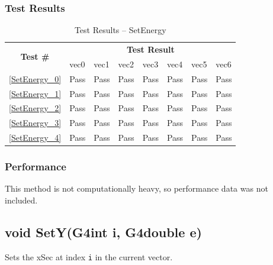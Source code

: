 \documentclass[12pt]{article}
\begin{document}
	\subsubsection{Test Results}
		\begin{table}[H]
		\centering
		\caption{Test Results -- SetEnergy}\label{SetEnergy_acc}
		\begin{tabular}{clllllll}
		\toprule
		\multirow{2}{*}{\bf Test \#} & \multicolumn{7}{c}{\bf Test Result}\\
		& vec0 & vec1 & vec2 & vec3 & vec4 & vec5 & vec6\\\midrule
		\ref{SetEnergy_0} & Pass & Pass & Pass & Pass & Pass & Pass & Pass\\
		\ref{SetEnergy_1} & Pass & Pass & Pass & Pass & Pass & Pass & Pass\\
		\ref{SetEnergy_2} & Pass & Pass & Pass & Pass & Pass & Pass & Pass\\
		\ref{SetEnergy_3} & Pass & Pass & Pass & Pass & Pass & Pass & Pass\\
		\ref{SetEnergy_4} & Pass & Pass & Pass & Pass & Pass & Pass & Pass\\
		\bottomrule
		\end{tabular}
		\end{table}

	\subsubsection{Performance}
		This method is not computationally heavy, so performance data was not included.
\subsection{void SetY(G4int i, G4double e)} %
	
	Sets the xSec at index \texttt{i} in the current vector. 
	
\end{document}
